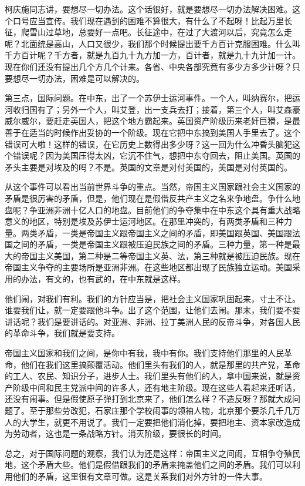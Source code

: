 柯庆施同志讲，要想尽一切办法。这个话很好，就是要想尽一切办法解决困难。这个口号应当宣传。我们现在遇到的困难不算很大，有什么了不起呀！比起万里长征，爬雪山过草地，总要好一点吧。长征途中，在过了大渡河以后，究竟怎么走呢？北面统是高山，人口又很少，我们那个时候提出要千方百计克服困难。什么叫千方百计呢？千方者，就是九百九十九方加一方，百计者，就是九十九计加一计。现在你们还没有提出几个方几个计来。各省、中央各部究竟有多少方多少计呀？只要想尽一切办法，困难是可以解决的。

第三点，国际问题。在中东，出了一个苏伊士运河事件。一个人，叫纳赛尔，把运河收归国有了；另外一个人，叫艾登，出一支兵去打；接着，第三个人，叫艾森豪威尔威尔，要赶走英国人，把这个地方霸起来。英国资产阶级历来老奸巨猾，是最善于在适当的时候作出妥协的一个阶级。现在它把中东搞到美国人手里去了。这个错误可大啦！这样的错误，在它历史上数得出多少呀？这一回为什么冲昏头脑犯这个错误呢？因为美国压得太凶，它沉不住气，想把中东夺回去，阻止美国。英国的矛头主要是对埃及的吗？不是。英国的文章是对付美国的，美国是对付英国的。

从这个事件可以看出当前世界斗争的重点。当然，帝国主义国家跟社会主义国家的矛盾是很厉害的矛盾，但是，他们现在是假借反共产主义之名来争地盘。争什么地盘呢？争亚洲非洲十亿人口的地盘。目前他们的争夺集中在中东这个具有重大战略意义的地区，特别是埃及苏伊士运河地区。在那里冲突的，有两类矛盾和三种力量。两类矛盾，一类是帝国主义跟帝国主义之间的矛盾，即美国跟英国、美国跟法国之间的矛盾，一类是帝国主义跟被压迫民族之间的矛盾。三种力量，第一种是最大的帝国主义美国，第二种是二等帝国主义英、法，第三种就是被压迫民族。现在帝国主义争夺的主要场所是亚洲非洲。在这些地区都出现了民族独立运动。美国采用的办法，有文的，也有武的，在中东就是这样。

他们闹，对我们有利。我们的方针应当是，把社会主义国家巩固起来，寸土不让。谁要我们让，就一定要跟他斗争。出了这个范围，让他们去闹。那末，我们要不要讲话呢？我们是要讲话的。对亚洲、非洲、拉丁美洲人民的反帝斗争，对各国人民的革命斗争，我们就是要支持。

帝国主义国家和我们之间，是你中有我，我中有你。我们支持他们那里的人民革命，他们在我们这里搞颠覆活动。他们里头有我们的人，就是那里的共产党，革命的工人、农民、知识分子，进步人士。我们里头有他们的人，拿中国来说，就是资产阶级中间和民主党派中间的许多人，还有地主阶级。现在这些人看起来还听话，还没有闹事。但是假使原子弹打到北京来了，他们怎么样？不造反呀？那就大成问题了。至于那些劳改犯，石家庄那个学校闹事的领袖人物，北京那个要杀几千几万人的大学生，就更不用说了。我们一定要把他们消化掉，要把地主、资本家改造成为劳动者，这也是一条战略方针。消灭阶级，要很长的时间。

总之，对于国际问题的观察，我们认为还是这样：帝国主义之间闹，互相争夺殖民地，这个矛盾大些。他们是假借跟我们的矛盾来掩盖他们之间的矛盾。我们可以利用他们的矛盾，这里很有文章可做。这是关系我们对外方针的一件大事。

